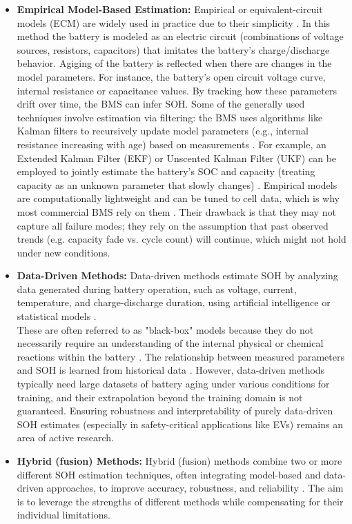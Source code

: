 \begin{itemize}
    \item \textbf{Empirical Model-Based Estimation:} Empirical or equivalent-circuit models (ECM) are widely used in practice due to their simplicity \cite{energies-13-02825-v2}. In this method the battery is modeled as an electric circuit (combinations of voltage sources, resistors, capacitors) that imitates the battery's charge/discharge behavior. Agiging of the battery is reflected when there are changes in the model parameters. For instance, the battery's open circuit voltage curve, internal resistance or capacitance values. By tracking how these parameters drift over time, the BMS can infer SOH. Some of the generally used techniques involve estimation via filtering: the BMS uses algorithms like Kalman filters to recursively update model parameters (e.g., internal resistance increasing with age) based on measurements \cite{wevj-12-00113}. For example, an Extended Kalman Filter (EKF) or Unscented Kalman Filter (UKF) can be employed to jointly estimate the battery’s SOC and capacity (treating capacity as an unknown parameter that slowly changes) \cite{wevj-12-00113}. Empirical models are computationally lightweight and can be tuned to cell data, which is why most commercial BMS rely on them \cite{energies-13-02825-v2}. Their drawback is that they may not capture all failure modes; they rely on the assumption that past observed trends (e.g. capacity fade vs. cycle count) will continue, which might not hold under new conditions.
    \item \textbf{Data-Driven Methods:} Data-driven methods estimate SOH by analyzing data generated during battery operation, such as voltage, current, temperature, and charge-discharge duration, using artificial intelligence or statistical models \cite{wevj-12-00113}\cite{energies-13-01811-v2}\cite{electronics-13-01675}\cite{energies-13-02825-v2}.\\ These are often referred to as "black-box" models because they do not necessarily require an understanding of the internal physical or chemical reactions within the battery \cite{electronics-13-01675}. The relationship between measured parameters and SOH is learned from historical data \cite{wevj-12-00113}\cite{electronics-13-01675}. However, data-driven methods typically need large datasets of battery aging under various conditions for training, and their extrapolation beyond the training domain is not guaranteed. Ensuring robustness and interpretability of purely data-driven SOH estimates (especially in safety-critical applications like EVs) remains an area of active research.
    \item \textbf{Hybrid (fusion) Methods:}\cite{electronics-13-01675}\cite{energies-13-01811-v2} Hybrid (fusion) methods combine two or more different SOH estimation techniques, often integrating model-based and data-driven approaches, to improve accuracy, robustness, and reliability \cite{wevj-12-00113}. The aim is to leverage the strengths of different methods while compensating for their individual limitations.
\end{itemize}

